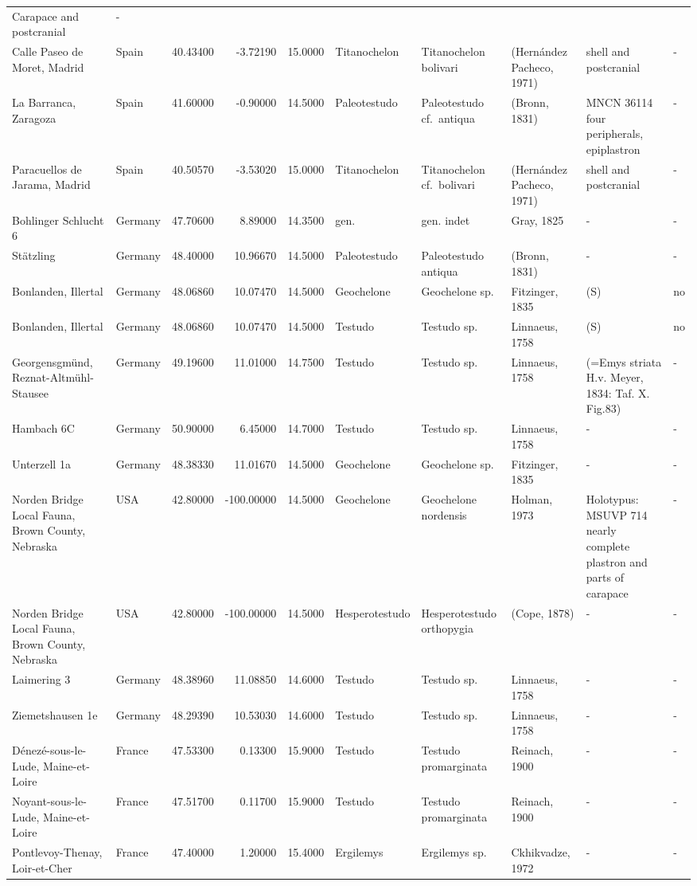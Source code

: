 \begin{landscape}
{\begin{longtable}[]{@{}llrrrlllll@{}}
Carapace and postcranial & -\tabularnewline
Calle Paseo de Moret, Madrid & Spain & 40.43400 & -3.72190 & 15.0000 &
Titanochelon & Titanochelon bolivari & (Hernández Pacheco, 1971) & shell
and postcranial & -\tabularnewline
La Barranca, Zaragoza & Spain & 41.60000 & -0.90000 & 14.5000 &
Paleotestudo & Paleotestudo cf.~antiqua & (Bronn, 1831) & MNCN 36114
four peripherals, epiplastron & -\tabularnewline
Paracuellos de Jarama, Madrid & Spain & 40.50570 & -3.53020 & 15.0000 &
Titanochelon & Titanochelon cf.~bolivari & (Hernández Pacheco, 1971) &
shell and postcranial & -\tabularnewline
Bohlinger Schlucht 6 & Germany & 47.70600 & 8.89000 & 14.3500 & gen. &
gen. indet & Gray, 1825 & - & -\tabularnewline
Stätzling & Germany & 48.40000 & 10.96670 & 14.5000 & Paleotestudo &
Paleotestudo antiqua & (Bronn, 1831) & - & -\tabularnewline
Bonlanden, Illertal & Germany & 48.06860 & 10.07470 & 14.5000 &
Geochelone & Geochelone sp. & Fitzinger, 1835 & (S) & no\tabularnewline
Bonlanden, Illertal & Germany & 48.06860 & 10.07470 & 14.5000 & Testudo
& Testudo sp. & Linnaeus, 1758 & (S) & no\tabularnewline
Georgensgmünd, Reznat-Altmühl-Stausee & Germany & 49.19600 & 11.01000 &
14.7500 & Testudo & Testudo sp. & Linnaeus, 1758 & (=Emys striata H.v.
Meyer, 1834: Taf. X. Fig.83) & -\tabularnewline
Hambach 6C & Germany & 50.90000 & 6.45000 & 14.7000 & Testudo & Testudo
sp. & Linnaeus, 1758 & - & -\tabularnewline
Unterzell 1a & Germany & 48.38330 & 11.01670 & 14.5000 & Geochelone &
Geochelone sp. & Fitzinger, 1835 & - & -\tabularnewline
Norden Bridge Local Fauna, Brown County, Nebraska & USA & 42.80000 &
-100.00000 & 14.5000 & Geochelone & Geochelone nordensis & Holman, 1973
& Holotypus: MSUVP 714 nearly complete plastron and parts of carapace &
-\tabularnewline
Norden Bridge Local Fauna, Brown County, Nebraska & USA & 42.80000 &
-100.00000 & 14.5000 & Hesperotestudo & Hesperotestudo orthopygia &
(Cope, 1878) & - & -\tabularnewline
Laimering 3 & Germany & 48.38960 & 11.08850 & 14.6000 & Testudo &
Testudo sp. & Linnaeus, 1758 & - & -\tabularnewline
Ziemetshausen 1e & Germany & 48.29390 & 10.53030 & 14.6000 & Testudo &
Testudo sp. & Linnaeus, 1758 & - & -\tabularnewline
Dénezé-sous-le-Lude, Maine-et-Loire & France & 47.53300 & 0.13300 &
15.9000 & Testudo & Testudo promarginata & Reinach, 1900 & - &
-\tabularnewline
Noyant-sous-le-Lude, Maine-et-Loire & France & 47.51700 & 0.11700 &
15.9000 & Testudo & Testudo promarginata & Reinach, 1900 & - &
-\tabularnewline
Pontlevoy-Thenay, Loir-et-Cher & France & 47.40000 & 1.20000 & 15.4000 &
Ergilemys & Ergilemys sp. & Ckhikvadze, 1972 & - & -\tabularnewline

\end{longtable}}
\end{landscape}
